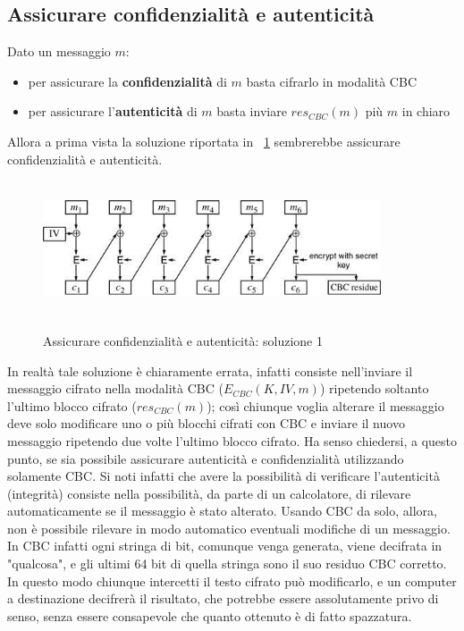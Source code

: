 \subsection{Assicurare confidenzialità e autenticità}
Dato un messaggio $m$:
\begin{itemize}
\item per assicurare la \textbf{confidenzialità} di $m$ basta cifrarlo in modalità CBC
\item per assicurare l'\textbf{autenticità} di $m$ basta inviare $res_{CBC}(m)$ più $m$ in chiaro
\end{itemize}
Allora a prima vista la soluzione riportata in \figurename~\ref{fig:residuo_CBC_1} sembrerebbe assicurare confidenzialità e autenticità.
\begin{figure}[htbp]
	\centering%
	\subfigure%
	{\includegraphics[height=4cm, width=10cm, keepaspectratio]{Immagini/modalita_operative/residuo_CBC_1.png}}
	\caption{Assicurare confidenzialità e autenticità: soluzione 1 \label{fig:residuo_CBC_1}} 	
\end{figure}
In realtà tale soluzione è chiaramente errata, infatti consiste nell'inviare il messaggio cifrato nella modalità CBC ($E_{CBC}(K, IV, m)$) ripetendo soltanto l'ultimo blocco cifrato ($res_{CBC}(m)$); così chiunque voglia alterare il messaggio deve solo modificare uno o più blocchi cifrati con CBC e inviare il nuovo messaggio ripetendo due volte l'ultimo blocco cifrato. 
\newline \newline 
Ha senso chiedersi, a questo punto, se sia possibile assicurare autenticità e confidenzialità utilizzando solamente CBC. Si noti infatti che avere la possibilità di verificare l'autenticità (integrità) consiste nella possibilità, da parte di un calcolatore, di rilevare automaticamente se il messaggio è stato alterato. Usando CBC da solo, allora, non è possibile rilevare in modo automatico eventuali modifiche di un messaggio. In CBC infatti ogni stringa di bit, comunque venga generata, viene decifrata in "qualcosa", e gli ultimi 64 bit di quella stringa sono il suo residuo CBC corretto. In questo modo chiunque intercetti il testo cifrato può modificarlo, e un computer a destinazione decifrerà il risultato, che potrebbe essere assolutamente privo di senso, senza essere consapevole che quanto ottenuto è di fatto spazzatura. 
